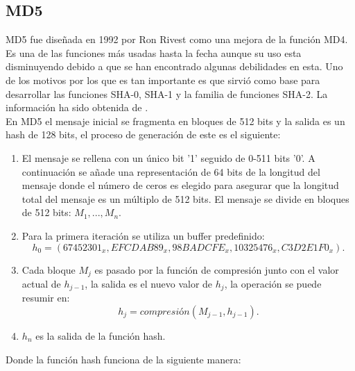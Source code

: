 \subsection{MD5}
MD5 fue diseñada en 1992 por Ron Rivest como una mejora de la función MD4. Es una de las funciones más usadas hasta la fecha aunque su uso esta disminuyendo debido a que se han encontrado algunas debilidades en esta. Uno de los motivos por los que es tan importante es que sirvió como base para desarrollar las funciones SHA-0, SHA-1 y la familia de funciones SHA-2.
La información ha sido obtenida de \cite{Wang2005}.\\
En MD5 el mensaje inicial se fragmenta en bloques de 512 bits y la salida es un hash de 128 bits, el proceso de generación de este es el siguiente:

\begin{enumerate}
	\item El mensaje se rellena con un único bit '1' seguido de 0-511 bits '0'. A continuación se añade una representación de 64 bits de la longitud del mensaje donde el número de ceros es elegido para asegurar que la longitud total del mensaje es un múltiplo de 512 bits. El mensaje se divide en bloques de 512 bits: $M_1,...,M_n$.
	\item Para la primera iteración se utiliza un buffer predefinido:
	$$
		h_0=(67452301_x, EFCDAB89_x, 98BADCFE_x, 10325476_x, C3D2E1F0_x).
	$$
	\item Cada bloque $M_j$ es pasado por la función de compresión junto con el valor actual de $h_{j-1}$, la salida es el nuevo valor de $h_j$, la operación se puede resumir en:
	$$
		h_j=compresión(M_{j-1},h_{j-1}).
	$$
	\item $h_n$ es la salida de la función hash.
\end{enumerate}
Donde la función hash funciona de la siguiente manera:
